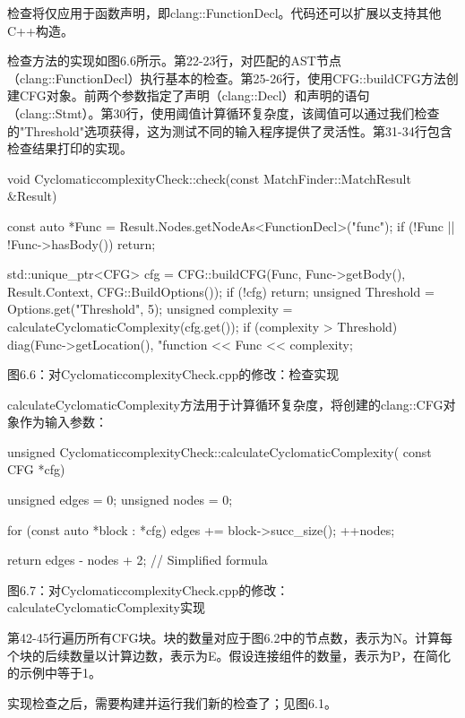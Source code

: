 检查将仅应用于函数声明，即clang::FunctionDecl。代码还可以扩展以支持其他C++构造。

检查方法的实现如图6.6所示。第22-23行，对匹配的AST节点（clang::FunctionDecl）执行基本的检查。第25-26行，使用CFG::buildCFG方法创建CFG对象。前两个参数指定了声明（clang::Decl）和声明的语句（clang::Stmt）。第30行，使用阈值计算循环复杂度，该阈值可以通过我们检查的"Threshold"选项获得，这为测试不同的输入程序提供了灵活性。第31-34行包含检查结果打印的实现。

\begin{cpp}
void CyclomaticcomplexityCheck::check(const MatchFinder::MatchResult &Result) {
  const auto *Func = Result.Nodes.getNodeAs<FunctionDecl>("func");
  if (!Func || !Func->hasBody()) return;

  std::unique_ptr<CFG> cfg =
    CFG::buildCFG(Func, Func->getBody(), Result.Context, CFG::BuildOptions());
  if (!cfg) return;
  unsigned Threshold = Options.get("Threshold", 5);
  unsigned complexity = calculateCyclomaticComplexity(cfg.get());
  if (complexity > Threshold) {
    diag(Func->getLocation(), "function %
      << Func << complexity;
  }
}
\end{cpp}

\begin{center}
图6.6：对CyclomaticcomplexityCheck.cpp的修改：检查实现
\end{center}

calculateCyclomaticComplexity方法用于计算循环复杂度，将创建的clang::CFG对象作为输入参数：

\begin{cpp}
unsigned CyclomaticcomplexityCheck::calculateCyclomaticComplexity(
    const CFG *cfg) {
  unsigned edges = 0;
  unsigned nodes = 0;

  for (const auto *block : *cfg) {
    edges += block->succ_size();
    ++nodes;
  }

  return edges - nodes + 2;  // Simplified formula
}
\end{cpp}

\begin{center}
图6.7：对CyclomaticcomplexityCheck.cpp的修改：calculateCyclomaticComplexity实现
\end{center}

第42-45行遍历所有CFG块。块的数量对应于图6.2中的节点数，表示为N。计算每个块的后续数量以计算边数，表示为E。假设连接组件的数量，表示为P，在简化的示例中等于1。

实现检查之后，需要构建并运行我们新的检查了；见图6.1。

